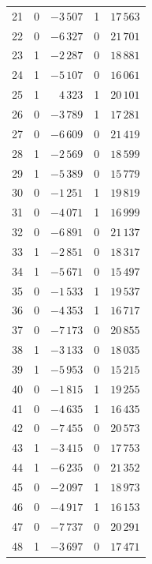 \documentclass[11pt,a4paper]{article}
\theoremstyle{definition}
\begin{document}
\begin{longtable}{@{}rrrrr@{}}
21 & 0 & $-3\,507$ & 1 & $17\,563$ \\
22 & 0 & $-6\,327$ & 0 & $21\,701$ \\
23 & 1 & $-2\,287$ & 0 & $18\,881$ \\
24 & 1 & $-5\,107$ & 0 & $16\,061$ \\
25 & 1 & $4\,323$ & 1 & $20\,101$ \\
26 & 0 & $-3\,789$ & 1 & $17\,281$ \\
27 & 0 & $-6\,609$ & 0 & $21\,419$ \\
28 & 1 & $-2\,569$ & 0 & $18\,599$ \\
29 & 1 & $-5\,389$ & 0 & $15\,779$ \\
30 & 0 & $-1\,251$ & 1 & $19\,819$ \\
31 & 0 & $-4\,071$ & 1 & $16\,999$ \\
32 & 0 & $-6\,891$ & 0 & $21\,137$ \\
33 & 1 & $-2\,851$ & 0 & $18\,317$ \\
34 & 1 & $-5\,671$ & 0 & $15\,497$ \\
35 & 0 & $-1\,533$ & 1 & $19\,537$ \\
36 & 0 & $-4\,353$ & 1 & $16\,717$ \\
37 & 0 & $-7\,173$ & 0 & $20\,855$ \\
38 & 1 & $-3\,133$ & 0 & $18\,035$ \\
39 & 1 & $-5\,953$ & 0 & $15\,215$ \\
40 & 0 & $-1\,815$ & 1 & $19\,255$ \\
41 & 0 & $-4\,635$ & 1 & $16\,435$ \\
42 & 0 & $-7\,455$ & 0 & $20\,573$ \\
43 & 1 & $-3\,415$ & 0 & $17\,753$ \\
44 & 1 & $-6\,235$ & 0 & $21\,352$ \\
45 & 0 & $-2\,097$ & 1 & $18\,973$ \\
46 & 0 & $-4\,917$ & 1 & $16\,153$ \\
47 & 0 & $-7\,737$ & 0 & $20\,291$ \\
48 & 1 & $-3\,697$ & 0 & $17\,471$ \\
\bottomrule
\end{longtable}
\end{document}
